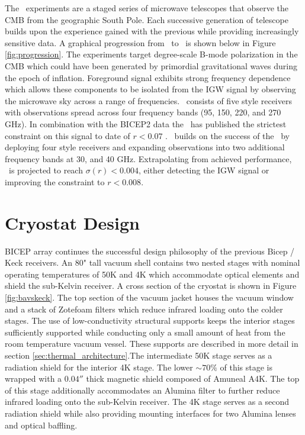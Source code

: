 \documentclass[]{spie}  %
\begin{document}
The \bk \ experiments are a staged series of microwave telescopes that observe
the CMB from the geographic South Pole. Each successive generation of
telescope builds upon the experience gained with the previous while providing
increasingly sensitive data. A graphical progression from  \ to
\biceparray \ is shown below in Figure \ref{fig:progression}. The experiments target degree-scale B-mode
polarization in the CMB which could have been generated by primordial
gravitational waves during the epoch of inflation. Foreground signal exhibits strong frequency dependence which allows these components to be isolated from the IGW
signal by observing the microwave sky across a range of frequencies.
\keckarray \ consists of five  style receivers with observations spread
across four frequency bands (95, 150, 220, and 270 GHz). In combination with the BICEP2 data the \keckarray \ has
published the strictest constraint on this signal to date of $r<0.07$
\cite{bk14}. \biceparray \ builds on the success of the \keckarray \ by
deploying four  style receivers and expanding observations into two
additional frequency bands at 30, and 40 GHz. Extrapolating from achieved performance,
\biceparray \ is projected to reach $\sigma(r)<0.004$, either detecting the IGW
signal or improving the constraint to $r<0.008$. 



	
\section{Cryostat Design}

BICEP array continues the successful design philosophy of
the previous Bicep / Keck receivers. An 80" tall vacuum shell contains two nested
stages with nominal operating temperatures of 50K and 4K which accommodate
optical elements and shield the sub-Kelvin receiver. A cross section of
the cryostat is shown in Figure \ref{fig:bavskeck}. The top section of the
vacuum jacket houses the vacuum window and a stack of Zotefoam filters which reduce infrared loading
onto the colder stages. The use of low-conductivity structural supports keeps
the interior stages sufficiently supported while conducting only a small
amount of heat from the room temperature vacuum vessel. These supports are
described in more detail in section \ref{sec:thermal_architecture}.The
intermediate 50K stage serves as a radiation shield for the interior 4K stage.
The lower $\sim70\%$ of this stage is wrapped with a $0.04''$ thick magnetic
shield composed of Amuneal A4K. The top of this stage additionally
accommodates an Alumina filter to further reduce infrared loading onto the
sub-Kelvin receiver. The 4K stage serves as a second radiation shield while
also providing mounting interfaces for two Alumina lenses and optical
baffling.
\end{document}
